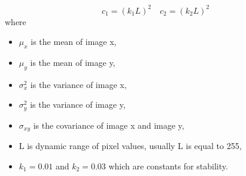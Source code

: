 \begin{itemize}
        \begin{equation}
          c_1 = (k_1 L)^2 \quad c_2 = (k_2 L)^2
        \end{equation}
        where
        \begin{itemize}
          \item \( \mu_x \) is the mean of image x,
          \item \( \mu_y \) is the mean of image y,
          \item \( \sigma_x^2 \) is the variance of image x,
          \item \( \sigma_y^2 \) is the variance of image y,
          \item \( 	\sigma_{xy} 	\) is the covariance of image x and image y,
          \item L is dynamic range of pixel values, usually L is equal to 255,
          \item \( k_1 = 0.01\) and \( k_2 = 0.03\) which are constants for stability.
        \end{itemize}

\end{itemize}